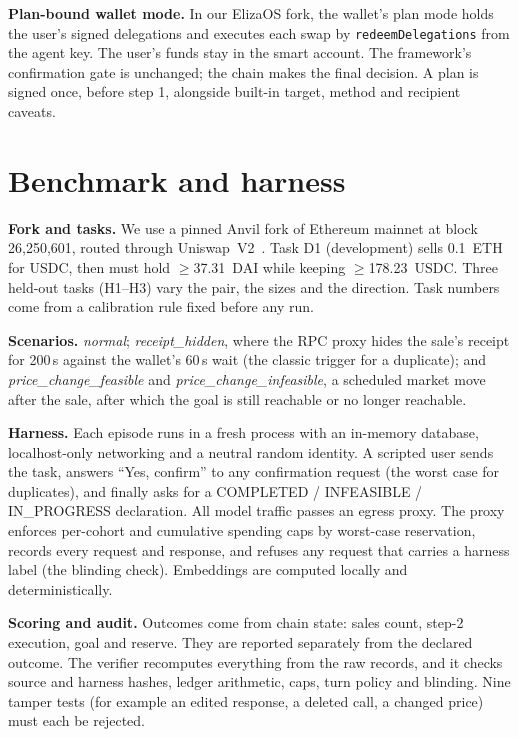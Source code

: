 \documentclass[conference]{IEEEtran}
\begin{document}
\textbf{Plan-bound wallet mode.} In our ElizaOS fork, the wallet's plan mode holds the user's signed delegations
and executes each swap by \texttt{redeemDelegations} from the agent key. The user's funds stay in the smart account.
The framework's confirmation gate is unchanged; the chain makes the final decision. A plan is signed once, before
step 1, alongside built-in target, method and recipient caveats.

\section{Benchmark and harness}\label{sec:bench}

\textbf{Fork and tasks.} We use a pinned Anvil fork of Ethereum mainnet at block 26{,}250{,}601, routed through
Uniswap~V2~\cite{uniswapv2}. Task D1 (development) sells 0.1~ETH for USDC, then must hold
$\ge$37.31~DAI while keeping $\ge$178.23~USDC. Three held-out tasks (H1--H3) vary the pair, the sizes and the
direction. Task numbers come from a calibration rule fixed before any run.

\textbf{Scenarios.} \emph{normal}; \emph{receipt\_hidden}, where the RPC proxy hides the sale's receipt for 200\,s
against the wallet's 60\,s wait (the classic trigger for a duplicate); and \emph{price\_change\_feasible} and
\emph{price\_change\_infeasible}, a scheduled market move after the sale, after which the goal is still reachable or
no longer reachable.

\textbf{Harness.} Each episode runs in a fresh process with an in-memory database, localhost-only networking and a
neutral random identity. A scripted user sends the task, answers ``Yes, confirm'' to any confirmation request (the
worst case for duplicates), and finally asks for a COMPLETED / INFEASIBLE / IN\_PROGRESS declaration. All model
traffic passes an egress proxy. The proxy enforces per-cohort and cumulative spending caps by worst-case reservation,
records every request and response, and refuses any request that carries a harness label (the blinding check).
Embeddings are computed locally and deterministically.

\textbf{Scoring and audit.} Outcomes come from chain state: sales count, step-2 execution, goal and reserve. They are
reported separately from the declared outcome. The verifier recomputes everything from the raw records, and it checks
source and harness hashes, ledger arithmetic, caps, turn policy and blinding. Nine tamper tests (for example an edited
response, a deleted call, a changed price) must each be rejected.
\end{document}
